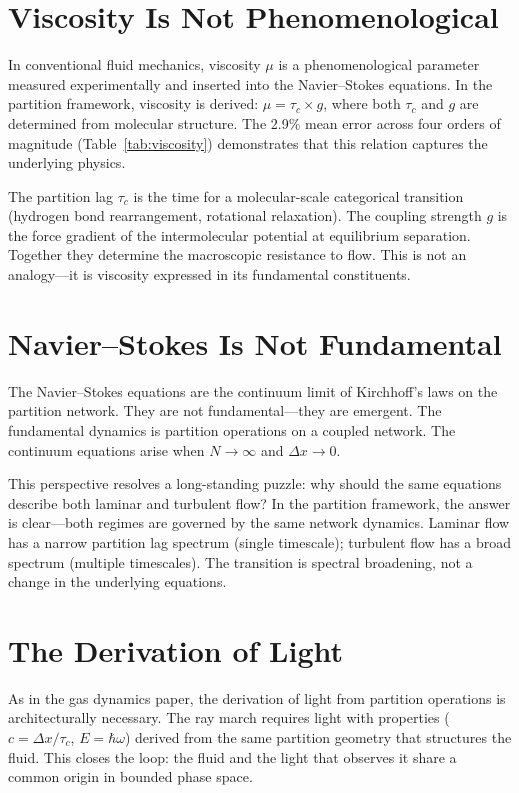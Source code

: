 \documentclass[twocolumn,10pt,a4paper]{article}
\theoremstyle{plain}
\theoremstyle{definition}
\theoremstyle{remark}
\newcommand{\tauc}{\tau_c}
\begin{document}
\section{Viscosity Is Not Phenomenological}
\label{sec:visc_discuss}

In conventional fluid mechanics, viscosity $\mu$ is a phenomenological parameter measured experimentally and inserted into the Navier--Stokes equations. In the partition framework, viscosity is derived: $\mu = \tauc \times g$, where both $\tauc$ and $g$ are determined from molecular structure. The 2.9\% mean error across four orders of magnitude (Table~\ref{tab:viscosity}) demonstrates that this relation captures the underlying physics.

The partition lag $\tauc$ is the time for a molecular-scale categorical transition (hydrogen bond rearrangement, rotational relaxation). The coupling strength $g$ is the force gradient of the intermolecular potential at equilibrium separation. Together they determine the macroscopic resistance to flow. This is not an analogy---it is viscosity expressed in its fundamental constituents.

\section{Navier--Stokes Is Not Fundamental}
\label{sec:ns_discuss}

The Navier--Stokes equations are the continuum limit of Kirchhoff's laws on the partition network. They are not fundamental---they are emergent. The fundamental dynamics is partition operations on a coupled network. The continuum equations arise when $N \to \infty$ and $\Delta x \to 0$.

This perspective resolves a long-standing puzzle: why should the same equations describe both laminar and turbulent flow? In the partition framework, the answer is clear---both regimes are governed by the same network dynamics. Laminar flow has a narrow partition lag spectrum (single timescale); turbulent flow has a broad spectrum (multiple timescales). The transition is spectral broadening, not a change in the underlying equations.

\section{The Derivation of Light}
\label{sec:light_discuss}

As in the gas dynamics paper, the derivation of light from partition operations is architecturally necessary. The ray march requires light with properties ($c = \Delta x/\tauc$, $E = \hbar\omega$) derived from the same partition geometry that structures the fluid. This closes the loop: the fluid and the light that observes it share a common origin in bounded phase space.
\end{document}
